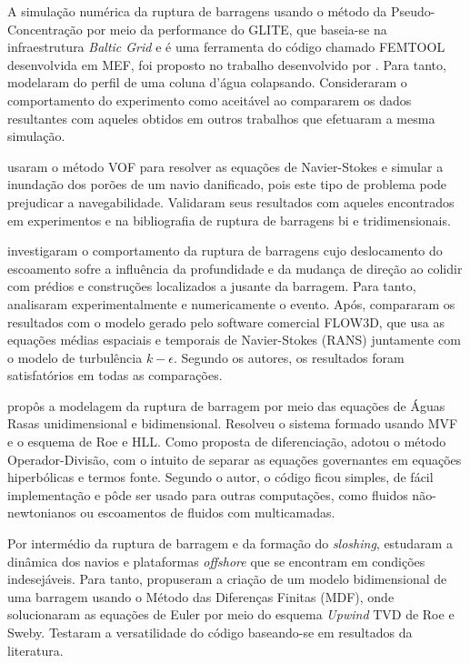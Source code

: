 A simulação numérica da ruptura de barragens usando o método da Pseudo-Concentração por meio da performance do GLITE, que baseia-se na infraestrutura \textit{Baltic Grid} e é uma ferramenta do código chamado FEMTOOL desenvolvida em MEF, foi proposto no trabalho desenvolvido por . Para tanto, modelaram do perfil de uma coluna d'água colapsando. Consideraram o comportamento do experimento como aceitável ao compararem os dados resultantes com aqueles obtidos em outros trabalhos que efetuaram a mesma simulação. 

 usaram o método VOF para resolver as equações de Navier-Stokes e simular a inundação dos porões de um navio danificado, pois este tipo de problema pode prejudicar a navegabilidade. Validaram seus resultados com aqueles encontrados em experimentos e na bibliografia de ruptura de barragens bi e tridimensionais.

 investigaram o comportamento da ruptura de barragens cujo deslocamento do escoamento sofre a influência da profundidade e da mudança de direção ao colidir com prédios e construções localizados a jusante da barragem. Para tanto, analisaram experimentalmente e numericamente o evento. Após, compararam os resultados com o  modelo gerado pelo software comercial FLOW3D, que usa as equações médias espaciais e temporais de Navier-Stokes (RANS) juntamente com o modelo de turbulência $k- \epsilon$. Segundo os autores, os resultados foram satisfatórios em todas as comparações.

 propôs a modelagem da ruptura de barragem por meio das equações de Águas Rasas unidimensional e bidimensional. Resolveu o sistema formado usando MVF e o esquema de Roe e HLL. Como proposta de diferenciação, adotou o método Operador-Divisão, com o intuito de separar as equações governantes em equações hiperbólicas e termos fonte. Segundo o autor, o código ficou simples, de fácil implementação e pôde ser usado para outras computações, como fluidos não-newtonianos ou escoamentos de fluidos com multicamadas.

Por intermédio da ruptura de barragem e da formação do \textit{sloshing},  estudaram a dinâmica dos navios e plataformas \textit{offshore} que se encontram em condições indesejáveis. Para tanto, propuseram a criação de um modelo bidimensional de uma barragem usando o Método das Diferenças Finitas (MDF), onde solucionaram as equações de Euler por meio do esquema \textit{Upwind} TVD de Roe e Sweby. Testaram a versatilidade do código baseando-se em resultados da literatura.

